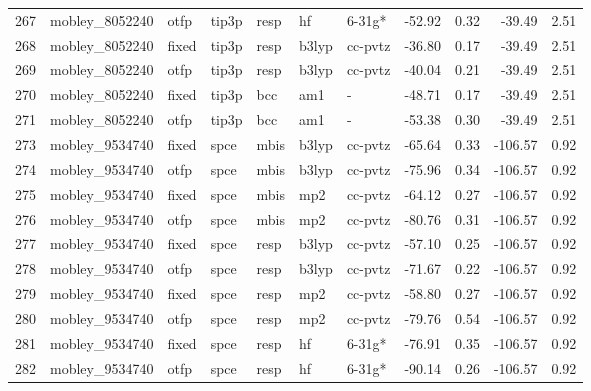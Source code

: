 \begin{tabular}{lllllllrrrr}
267 &                mobley\_8052240 &   otfp &  tip3p &   resp &      hf &       6-31g* &      -52.92 &     0.32 &      -39.49 &      2.51 \\
268 &                mobley\_8052240 &  fixed &  tip3p &   resp &   b3lyp &      cc-pvtz &      -36.80 &     0.17 &      -39.49 &      2.51 \\
269 &                mobley\_8052240 &   otfp &  tip3p &   resp &   b3lyp &      cc-pvtz &      -40.04 &     0.21 &      -39.49 &      2.51 \\
270 &                mobley\_8052240 &  fixed &  tip3p &    bcc &     am1 &            - &      -48.71 &     0.17 &      -39.49 &      2.51 \\
271 &                mobley\_8052240 &   otfp &  tip3p &    bcc &     am1 &            - &      -53.38 &     0.30 &      -39.49 &      2.51 \\
273 &                mobley\_9534740 &  fixed &   spce &   mbis &   b3lyp &      cc-pvtz &      -65.64 &     0.33 &     -106.57 &      0.92 \\
274 &                mobley\_9534740 &   otfp &   spce &   mbis &   b3lyp &      cc-pvtz &      -75.96 &     0.34 &     -106.57 &      0.92 \\
275 &                mobley\_9534740 &  fixed &   spce &   mbis &     mp2 &      cc-pvtz &      -64.12 &     0.27 &     -106.57 &      0.92 \\
276 &                mobley\_9534740 &   otfp &   spce &   mbis &     mp2 &      cc-pvtz &      -80.76 &     0.31 &     -106.57 &      0.92 \\
277 &                mobley\_9534740 &  fixed &   spce &   resp &   b3lyp &      cc-pvtz &      -57.10 &     0.25 &     -106.57 &      0.92 \\
278 &                mobley\_9534740 &   otfp &   spce &   resp &   b3lyp &      cc-pvtz &      -71.67 &     0.22 &     -106.57 &      0.92 \\
279 &                mobley\_9534740 &  fixed &   spce &   resp &     mp2 &      cc-pvtz &      -58.80 &     0.27 &     -106.57 &      0.92 \\
280 &                mobley\_9534740 &   otfp &   spce &   resp &     mp2 &      cc-pvtz &      -79.76 &     0.54 &     -106.57 &      0.92 \\
281 &                mobley\_9534740 &  fixed &   spce &   resp &      hf &       6-31g* &      -76.91 &     0.35 &     -106.57 &      0.92 \\
282 &                mobley\_9534740 &   otfp &   spce &   resp &      hf &       6-31g* &      -90.14 &     0.26 &     -106.57 &      0.92 \\

\end{tabular}
